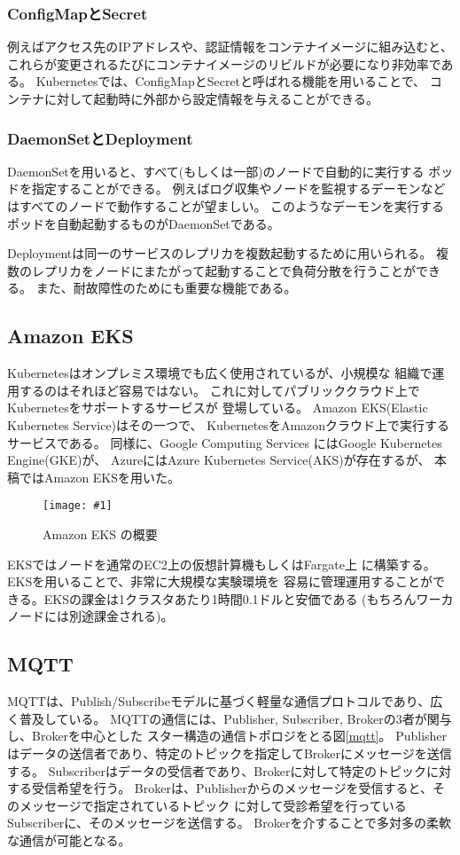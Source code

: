 \documentclass[submit,techrep]{ipsj}
\newcommand{\reffig}[1]{図\ref{#1}}
\newcommand{\epsfig}[4]{
\begin{figure}[tb]
  \begin{center}
    \texttt{[image: \#1]}
  \end{center}
  \caption{#3}
  \label{#4}
\end{figure}}
\newcommand{\kbs}{Kubernetes}
\begin{document}
\subsubsection{ConfigMapとSecret}

例えばアクセス先のIPアドレスや、認証情報をコンテナイメージに組み込むと、
これらが変更されるたびにコンテナイメージのリビルドが必要になり非効率である。
\kbs では、ConfigMapとSecretと呼ばれる機能を用いることで、
コンテナに対して起動時に外部から設定情報を与えることができる。


\subsubsection{DaemonSetとDeployment}
DaemonSetを用いると、すべて(もしくは一部)のノードで自動的に実行する
ポッドを指定することができる。
例えばログ収集やノードを監視するデーモンなどはすべてのノードで動作することが望ましい。
このようなデーモンを実行するポッドを自動起動するものがDaemonSetである。

Deploymentは同一のサービスのレプリカを複数起動するために用いられる。
複数のレプリカをノードにまたがって起動することで負荷分散を行うことができる。
また、耐故障性のためにも重要な機能である。


\subsection{Amazon EKS}
\kbs はオンプレミス環境でも広く使用されているが、小規模な
組織で運用するのはそれほど容易ではない。
これに対してパブリッククラウド上で\kbs をサポートするサービスが
登場している。
%
Amazon EKS(Elastic Kubernetes Service)\cite{EKS}はその一つで、
KubernetesをAmazonクラウド上で実行するサービスである。
同様に、Google Computing Services にはGoogle Kubernetes Engine(GKE)\cite{GKE}が、
AzureにはAzure Kubernetes Service(AKS)\cite{aks}が存在するが、
本稿ではAmazon EKSを用いた。

\epsfig{figs/eks.pdf}{width=8.5cm}{Amazon EKS の概要}{eks}

EKSではノードを通常のEC2上の仮想計算機もしくはFargate\cite{fargate}上
に構築する。EKSを用いることで、非常に大規模な実験環境を
容易に管理運用することができる。EKSの課金は1クラスタあたり1時間0.1ドルと安価である
(もちろんワーカノードには別途課金される)。



\subsection{MQTT}
MQTT\cite{MQTT}は、Publish/Subscribeモデルに基づく軽量な通信プロトコルであり、広く普及している。
MQTTの通信には、Publisher, Subscriber, Brokerの3者が関与し、Brokerを中心とした
スター構造の通信トポロジをとる\reffig{mqtt}。
Publisherはデータの送信者であり、特定のトピックを指定してBrokerにメッセージを送信する。
Subscriberはデータの受信者であり、Brokerに対して特定のトピックに対する受信希望を行う。
Brokerは、Publisherからのメッセージを受信すると、そのメッセージで指定されているトピック
に対して受診希望を行っているSubscriberに、そのメッセージを送信する。
Brokerを介することで多対多の柔軟な通信が可能となる。
\end{document}
